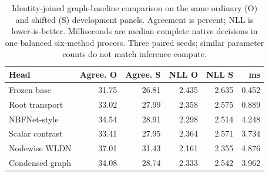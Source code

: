 \begin{table}[ht]
\centering\small
\caption{Identity-joined graph-baseline comparison on the same ordinary (O) and shifted (S) development panels. Agreement is percent; NLL is lower-is-better. Milliseconds are median complete native decisions in one balanced six-method process. Three paired seeds; similar parameter counts do not match inference compute.\label{tab:graph-baselines}}
\begin{tabular}{lrrrrr}
\toprule
Head & Agree. O & Agree. S & NLL O & NLL S & ms \\
\midrule
Frozen base & 31.75 & 26.81 & 2.435 & 2.635 & 0.452 \\
Root transport & 33.02 & 27.99 & 2.358 & 2.575 & 0.889 \\
NBFNet-style & 34.54 & 28.91 & 2.298 & 2.514 & 4.248 \\
Scalar contrast & 33.41 & 27.95 & 2.364 & 2.571 & 3.734 \\
Nodewise WLDN & 37.01 & 31.43 & 2.161 & 2.355 & 4.876 \\
Condensed graph & 34.08 & 28.74 & 2.333 & 2.542 & 3.962 \\
\bottomrule
\end{tabular}
\end{table}

